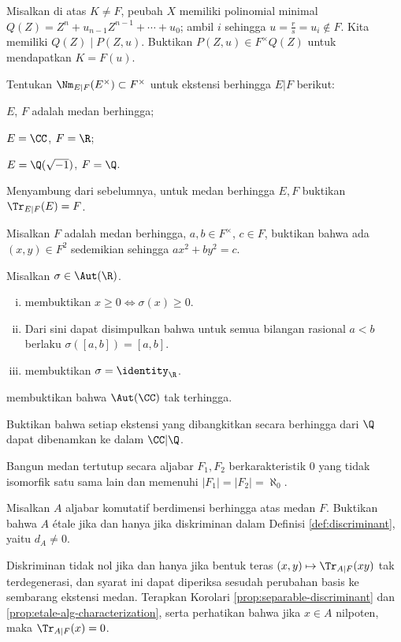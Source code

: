 \begin{Exercises}
	\begin{hint}
		Misalkan di atas $K \neq F$, peubah $X$ memiliki polinomial minimal $Q(Z) = Z^n + u_{n-1} Z^{n-1} + \cdots + u_0$; ambil $i$ sehingga $u = \frac{r}{s} = u_i \notin F$. Kita memiliki $Q(Z) \mid P(Z,u)$. Buktikan $P(Z,u) \in F^\times Q(Z)$ untuk mendapatkan $K=F(u)$.
	\end{hint}
	\item Tentukan $\Nm_{E|F}(E^\times) \subset F^\times$ untuk ekstensi berhingga $E|F$ berikut:
		\begin{compactenum}[(i)]
			\item $E$, $F$ adalah medan berhingga; 
			\item $E=\CC$, $F=\R$;
			\item $E=\Q(\sqrt{-1})$, $F=\Q$.
		\end{compactenum}
	\item Menyambung dari sebelumnya, untuk medan berhingga $E, F$ buktikan $\Tr_{E|F}(E)=F$.
	\item Misalkan $F$ adalah medan berhingga, $a, b \in F^\times$, $c \in F$, buktikan bahwa ada $(x,y) \in F^2$ sedemikian sehingga $ax^2 + by^2 = c$.
	\item Misalkan $\sigma \in \Aut(\R)$.
		\begin{enumerate}[(i)]
			\item membuktikan $x \geq 0 \iff \sigma(x) \geq 0$. 
			\item Dari sini dapat disimpulkan bahwa untuk semua bilangan rasional $a < b$ berlaku $\sigma([a,b]) = [a,b]$.
			\item membuktikan $\sigma = \identity_{\R}$.
		\end{enumerate}
	\item membuktikan bahwa $\Aut(\CC)$ tak terhingga.
	\item Buktikan bahwa setiap ekstensi yang dibangkitkan secara berhingga dari $\Q$ dapat dibenamkan ke dalam $\CC|\Q$.
	\item Bangun medan tertutup secara aljabar $F_1, F_2$ berkarakteristik $0$ yang tidak isomorfik satu sama lain dan memenuhi $|F_1|=|F_2|=\aleph_0$.
	\item Misalkan $A$ aljabar komutatif berdimensi berhingga atas medan $F$. Buktikan bahwa $A$ étale jika dan hanya jika diskriminan dalam Definisi \ref{def:discriminant}, yaitu $d_A \neq 0$.
	\begin{hint}
		Diskriminan tidak nol jika dan hanya jika bentuk teras $(x,y) \mapsto \Tr_{A|F}(xy)$ tak terdegenerasi, dan syarat ini dapat diperiksa sesudah perubahan basis ke sembarang ekstensi medan. Terapkan Korolari \ref{prop:separable-discriminant} dan \ref{prop:etale-alg-characterization}, serta perhatikan bahwa jika $x \in A$ nilpoten, maka $\Tr_{A|F}(x)=0$.
	\end{hint}
\end{Exercises}
